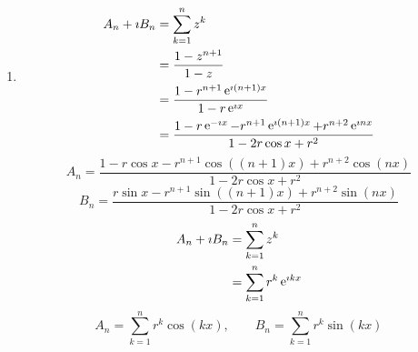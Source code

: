 {\begin{Solution}
\begin{enumerate}
\begin{align*}
      &= \log \left(1 + r \cos x + \imath r \sin x \right) \\
      &= \log \left| 1 + r \cos x + \imath r \sin x \right| 
      + \imath \arg \left( 1 + r \cos x + \imath r \sin x \right) \\
      &= \log \sqrt{ ( 1 + r \cos x )^2 + ( r \sin x )^2 } 
      + \imath \arctan \left( 1 + r \cos x, r \sin x \right) 
    \end{align*}
    \[
    \boxed{
      A = \frac{1}{2} \log \left( 1 + 2 r \cos x + r^2 \right), \qquad
      B = \arctan \left( 1 + r \cos x, r \sin x \right) 
      }
    \]
  \item
    \begin{align*}
      A_n + \imath B_n
      &= \sum_{k=1}^n z^k \\
      &= \frac{1 - z^{n+1}}{1-z} \\
      &= \frac{ 1 - r^{n+1} \mathop{\mathrm{e}}\nolimits^{\imath (n+1) x} }{ 1 - r \mathop{\mathrm{e}}\nolimits^{\imath x} } \\
      &= \frac{ 1 - r \mathop{\mathrm{e}}\nolimits^{- \imath x} - r^{n+1} \mathop{\mathrm{e}}\nolimits^{\imath (n+1) x} 
        + r^{n+2} \mathop{\mathrm{e}}\nolimits^{\imath n x} }{ 1 - 2 r \cos x + r^2 }
    \end{align*}
    \[
    \boxed{
      A_n = \frac{ 1 - r \cos x - r^{n+1} \cos((n+1)x) + r^{n+2} \cos(n x) }
      { 1 - 2 r \cos x + r^2 }
      }
    \]
    \[
    \boxed{
      B_n = \frac{ r \sin x - r^{n+1} \sin((n+1)x) + r^{n+2} \sin(n x) }
      { 1 - 2 r \cos x + r^2 }
      }
    \]
    \begin{align*}
      A_n + \imath B_n
      &= \sum_{k=1}^n z^k \\
      &= \sum_{k=1}^n r^k \mathop{\mathrm{e}}\nolimits^{\imath k x}
    \end{align*}
    \[
    \boxed{
      A_n = \sum_{k=1}^n r^k \cos(k x), \qquad
      B_n = \sum_{k=1}^n r^k \sin(k x)
      }
    \]
  \end{enumerate}
\end{Solution}





}
